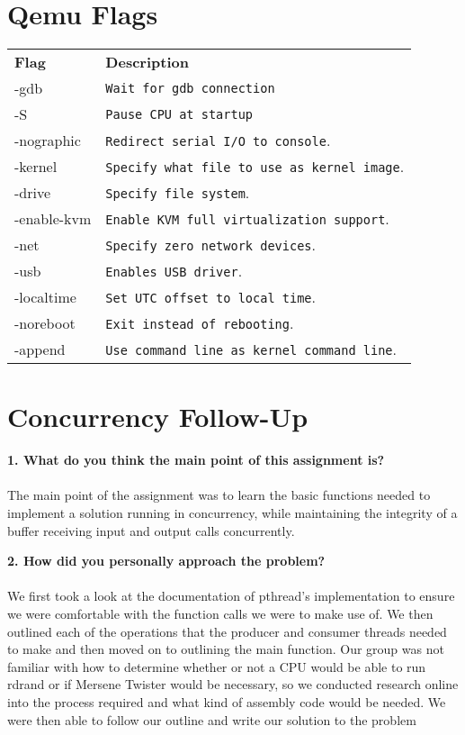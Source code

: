 \documentclass[letterpaper,10pt]{article}
\begin{document}
\section{Qemu Flags}
\begin{tabular}{lp{12cm}}
  \label{tabular:legend:git-log}
  \textbf{Flag} & \textbf{Description} \\
  -gdb & \texttt{Wait for gdb connection} \\
  -S & \texttt{Pause CPU at startup} \\
  -nographic & \texttt{Redirect serial I/O to console}. \\
  -kernel & \texttt{Specify what file to use as kernel image}. \\
  -drive & \texttt{Specify file system}. \\
  -enable-kvm & \texttt{Enable KVM full virtualization support}. \\
  -net & \texttt{Specify zero network devices}. \\
  -usb & \texttt{Enables USB driver}. \\
  -localtime & \texttt{Set UTC offset to local time}. \\
  -noreboot & \texttt{Exit instead of rebooting}. \\
  -append & \texttt{Use command line as kernel command line}. \\

\end{tabular}


\section{Concurrency Follow-Up}
\textbf{1. What do you think the main point of this assignment is?} \\ \\
\textnormal{The main point of the assignment was to learn the basic functions needed to implement a solution running in concurrency, while maintaining the integrity of a buffer receiving input and output calls concurrently.}

\textbf{2. How did you personally approach the problem?} \\ \\
\textnormal{We first took a look at the documentation of pthread's implementation to ensure we were comfortable with the function calls we were to make use of. 
We then outlined each of the operations that the producer and consumer threads needed to make and then moved on to outlining the main function. 
Our group was not familiar with how to determine whether or not a CPU would be able to run rdrand or if Mersene Twister would be necessary, so we conducted research online into the process required and what kind of assembly code would be needed.
We were then able to follow our outline and write our solution to the problem}
\end{document}
